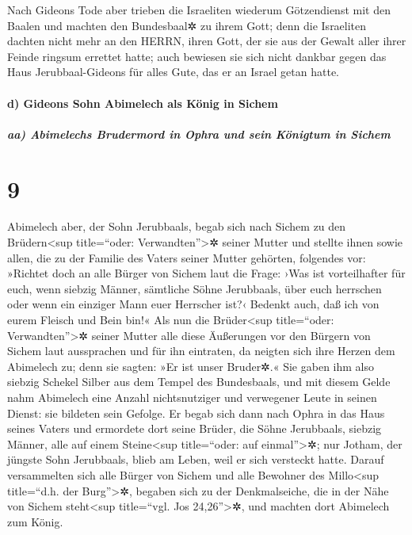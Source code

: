 Nach Gideons Tode aber trieben die Israeliten wiederum
Götzendienst mit den Baalen und machten den Bundesbaal✲ zu ihrem Gott;
denn die Israeliten dachten nicht mehr an den HERRN,
ihren Gott, der sie aus der Gewalt aller ihrer Feinde ringsum errettet
hatte; auch bewiesen sie sich nicht dankbar gegen das
Haus Jerubbaal-Gideons für alles Gute, das er an Israel getan hatte.

\hypertarget{d-gideons-sohn-abimelech-als-kuxf6nig-in-sichem}{%
\paragraph{d) Gideons Sohn Abimelech als König in
Sichem}\label{d-gideons-sohn-abimelech-als-kuxf6nig-in-sichem}}

\hypertarget{aa-abimelechs-brudermord-in-ophra-und-sein-kuxf6nigtum-in-sichem}{%
\subparagraph{aa) Abimelechs Brudermord in Ophra und sein Königtum in
Sichem}\label{aa-abimelechs-brudermord-in-ophra-und-sein-kuxf6nigtum-in-sichem}}

\hypertarget{section-8}{%
\section{9}\label{section-8}}

Abimelech aber, der Sohn Jerubbaals, begab sich nach
Sichem zu den Brüdern\textless sup title=``oder:
Verwandten''\textgreater✲ seiner Mutter und stellte ihnen sowie allen,
die zu der Familie des Vaters seiner Mutter gehörten, folgendes vor:
»Richtet doch an alle Bürger von Sichem laut die Frage:
›Was ist vorteilhafter für euch, wenn siebzig Männer, sämtliche Söhne
Jerubbaals, über euch herrschen oder wenn ein einziger Mann euer
Herrscher ist?‹ Bedenkt auch, daß ich von eurem Fleisch und Bein bin!«
Als nun die Brüder\textless sup title=``oder:
Verwandten''\textgreater✲ seiner Mutter alle diese Äußerungen vor den
Bürgern von Sichem laut aussprachen und für ihn eintraten, da neigten
sich ihre Herzen dem Abimelech zu; denn sie sagten: »Er ist unser
Bruder✲.« Sie gaben ihm also siebzig Schekel Silber aus
dem Tempel des Bundesbaals, und mit diesem Gelde nahm Abimelech eine
Anzahl nichtsnutziger und verwegener Leute in seinen Dienst: sie
bildeten sein Gefolge. Er begab sich dann nach Ophra in
das Haus seines Vaters und ermordete dort seine Brüder, die Söhne
Jerubbaals, siebzig Männer, alle auf einem Steine\textless sup
title=``oder: auf einmal''\textgreater✲; nur Jotham, der jüngste Sohn
Jerubbaals, blieb am Leben, weil er sich versteckt hatte.
Darauf versammelten sich alle Bürger von Sichem und alle
Bewohner des Millo\textless sup title=``d.h. der Burg''\textgreater✲,
begaben sich zu der Denkmalseiche, die in der Nähe von Sichem
steht\textless sup title=``vgl. Jos 24,26''\textgreater✲, und machten
dort Abimelech zum König.


